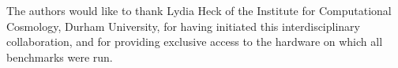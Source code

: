 \documentclass[a4paper,conference]{IEEEtran}
\begin{document}
The authors would like to thank Lydia Heck of the Institute for Computational
Cosmology, Durham University, for having initiated this interdisciplinary
collaboration, and for providing exclusive access to the hardware on which
all benchmarks were run.






%


\end{document}
